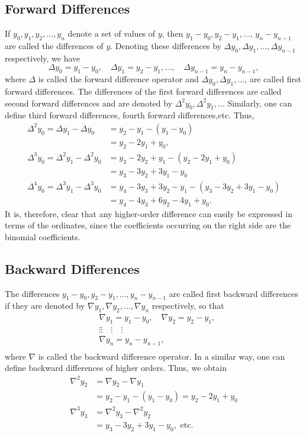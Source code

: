 \documentclass[12pt,a4paper,oneside]{book}
\begin{document}
\subsection{Forward Differences}
If $y_0, y_1, y_2, \ldots, y_n$ denote a set of values of $y$, then $y_1-y_0, y_2-y_1, \ldots$, $y_n-y_{n-1}$ are called the differences of $y$. Denoting these differences by $\Delta y_0, \Delta y_1, \ldots, \Delta y_{n-1}$ respectively, we have
$$
\Delta y_0=y_1-y_0, \quad \Delta y_1=y_2-y_1, \ldots, \quad \Delta y_{n-1}=y_n-y_{n-1},
$$
where $\Delta$ is called the forward difference operator and $\Delta y_0, \Delta y_1, \ldots$, are called first forward differences. The differences of the first forward differences are called second forward differences and are denoted by $\Delta^2 y_0, \Delta^2 y_1, \ldots$ Similarly, one can define third forward differences, fourth forward differences,etc.
Thus,
$$
\begin{aligned}
	\Delta^2 y_0=\Delta y_1-\Delta y_0 & =y_2-y_1-\left(y_1-y_0\right) \\
	& =y_2-2 y_1+y_0, \\
	\Delta^3 y_0=\Delta^2 y_1-\Delta^2 y_0 & =y_3-2 y_2+y_1-\left(y_2-2 y_1+y_0\right) \\
	& =y_3-3 y_2+3 y_1-y_0 \\
	\Delta^4 y_0=\Delta^3 y_1-\Delta^3 y_0 & =y_4-3 y_3+3 y_2-y_1-\left(y_3-3 y_2+3 y_1-y_0\right) \\
	& =y_4-4 y_3+6 y_2-4 y_1+y_0 .
\end{aligned}
$$
It is, therefore, clear that any higher-order difference can easily be expressed in terms of the ordinates, since the coefficients occurring on the right side are the binomial coefficients.
\subsection{Backward Differences }
The differences $y_1-y_0, y_2-y_1, \ldots, y_n-y_{n-1}$ are called first backward differences if they are denoted by $\nabla y_1, \nabla y_2, \ldots, \nabla y_n$ respectively, so that
$$
\begin{aligned}
	& \nabla y_1=y_1-y_0, \quad \nabla y_2=y_2-y_1, \\
	& \vdots \vdots \quad \vdots \quad \vdots \\
	& \nabla y_n=y_n-y_{n-1}, \\
	&
\end{aligned}
$$
where $\nabla$ is called the backward difference operator. In a similar way, one can define backward differences of higher orders.
Thus, we obtain
$$
\begin{aligned}
	\nabla^2 y_2 & =\nabla y_2-\nabla y_1 \\
	& =y_2-y_1-\left(y_1-y_0\right)=y_2-2 y_1+y_0 \\
	\nabla^3 y_3 & =\nabla^2 y_3-\nabla^2 y_2 \\
	& =y_3-3 y_2+3 y_1-y_0, \text { etc. }
\end{aligned}
$$\\
\end{document}
